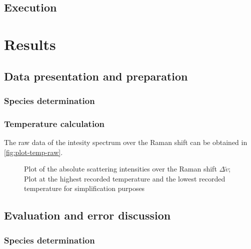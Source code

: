 \section{Execution}

\chapter{Results}
\label{chap:results}

\section{Data presentation and preparation}

\subsection*{Species determination}
\label{subsec:spec-prep}

\subsection*{Temperature calculation}
\label{subsec:temp-prep}

The raw data of the intesity spectrum over the Raman shift can be obtained in \autoref{fig:plot-temp-raw}. 

\begin{figure}[!htb]
    \centering
    
    \caption[Absolute Raman shift intensities for the lowest and highest temperatures]{Plot of the absolute scattering intensities over the Raman shift $\Delta \tilde{v}$; Plot at the highest recorded temperature and the lowest recorded temperature for simplification purposes}
    \label{fig:plot-temp-raw}
\end{figure}

\section{Evaluation and error discussion}
\label{sec:eval}

\subsection*{Species determination}
\label{subsec:spec-eval}

